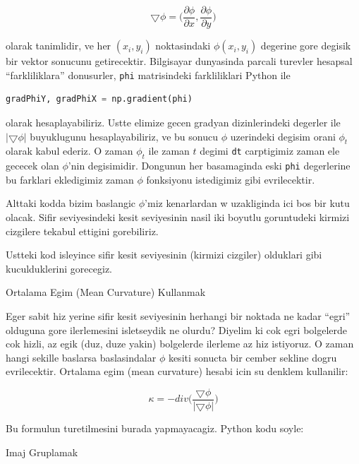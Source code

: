 \documentclass[12pt,fleqn]{article}
\begin{document}
\[ 
\bigtriangledown \phi = \bigg(
\frac{\partial \phi}{\partial x},
\frac{\partial \phi}{\partial y} \bigg)
 \]

olarak tanimlidir, ve her $(x_i,y_i)$ noktasindaki $\phi(x_i,y_i)$
degerine gore degisik bir vektor sonucunu getirecektir. Bilgisayar
dunyasinda parcali turevler hesapsal ``farkliliklara'' donusurler,
\verb!phi! matrisindeki farkliliklari Python ile

\begin{lstlisting}[language=Python]
gradPhiY, gradPhiX = np.gradient(phi)    
\end{lstlisting}

olarak hesaplayabiliriz. Ustte elimize gecen gradyan dizinlerindeki
degerler ile $|\bigtriangledown\phi|$ buyuklugunu hesaplayabiliriz, ve bu
sonucu $\phi$ uzerindeki degisim orani $\phi_t$ olarak kabul ederiz. O
zaman $\phi_t$ ile zaman $t$ degimi \verb!dt! carptigimiz zaman ele gececek
olan $\phi$'nin degisimidir. Dongunun her basamaginda eski \verb!phi!
degerlerine bu farklari ekledigimiz zaman $\phi$ fonksiyonu istedigimiz
gibi evrilecektir.

Alttaki kodda bizim baslangic $\phi$'miz kenarlardan w uzakliginda ici bos
bir kutu olacak. Sifir seviyesindeki kesit seviyesinin nasil iki boyutlu
goruntudeki kirmizi cizgilere tekabul ettigini gorebiliriz.



Ustteki kod isleyince sifir kesit seviyesinin (kirmizi cizgiler) olduklari
gibi kuculduklerini gorecegiz.

Ortalama Egim (Mean Curvature) Kullanmak

Eger sabit hiz yerine sifir kesit seviyesinin herhangi bir noktada ne kadar
``egri'' olduguna gore ilerlemesini isletseydik ne olurdu?  Diyelim ki cok
egri bolgelerde cok hizli, az egik (duz, duze yakin) bolgelerde ilerleme az
hiz istiyoruz. O zaman hangi sekille baslarsa baslasindalar $\phi$ kesiti
sonucta bir cember sekline dogru evrilecektir. Ortalama egim (mean
curvature) hesabi icin su denklem kullanilir:

\[ \kappa = -div \bigg( \frac{\bigtriangledown \phi}
{|\bigtriangledown \phi| } \bigg) \]

Bu formulun turetilmesini burada yapmayacagiz. Python kodu soyle:



Imaj Gruplamak
\end{document}
